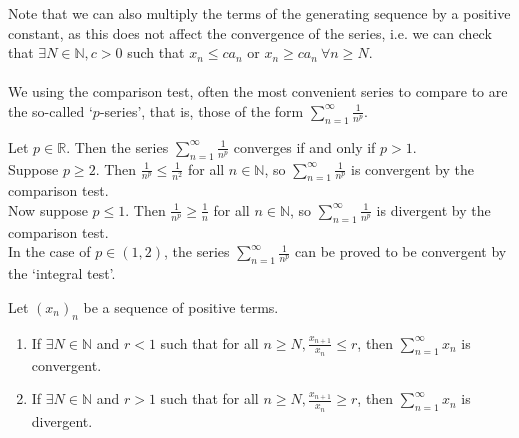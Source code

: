 \documentclass[../real_analysis.tex]{subfiles}
\begin{document}
        Note that we can also multiply the terms of the generating sequence by a positive constant, as this does not affect the convergence of the series, i.e. we can check that $\exists N\in\mathbb{N}, c>0$ such that $x_n\leq ca_n$ or $x_n\geq ca_n\ \forall n\geq N$.

        \paragraph{}
        We using the comparison test, often the most convenient series to compare to are the so-called `$p$-series', that is, those of the form $\sum_{n=1}^\infty\frac{1}{n^p}$.
        \begin{example}
            Let $p\in\mathbb{R}$. Then the series $\sum_{n=1}^\infty\frac{1}{n^p}$ converges if and only if $p>1$.\\
            Suppose $p\geq2$. Then $\frac{1}{n^p}\leq\frac{1}{n^2}$ for all $n\in\mathbb{N}$, so $\sum_{n=1}^\infty\frac{1}{n^p}$ is convergent by the comparison test.\\
            Now suppose $p\leq1$. Then $\frac{1}{n^p}\geq\frac{1}{n}$ for all $n\in\mathbb{N}$, so $\sum_{n=1}^\infty\frac{1}{n^p}$ is divergent by the comparison test.\\
            In the case of $p\in(1, 2)$, the series $\sum_{n=1}^\infty\frac{1}{n^p}$ can be proved to be convergent by the `integral test'.
        \end{example}
        \begin{theorem}
            Let $(x_n)_n$ be a sequence of positive terms.
            \begin{enumerate}[label={\upshape(\roman*)}]
                \item If $\exists N\in\mathbb{N}$ and $r<1$ such that for all $n\geq N, \frac{x_{n+1}}{x_n}\leq r$, then $\sum_{n=1}^\infty x_n$ is convergent.
                \item If $\exists N\in\mathbb{N}$ and $r>1$ such that for all $n\geq N, \frac{x_{n+1}}{x_n}\geq r$, then $\sum_{n=1}^\infty x_n$ is divergent.
                \end{enumerate}
        \end{theorem}
\end{document}
